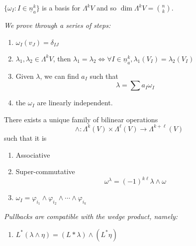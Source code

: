 \documentclass{article}
\numberwithin{equation}{section}
\begin{document}
\begin{definition}
    $\{\omega_I: I \in \underline{n}_a^k\}$ is a basis for $\Lambda^kV$ and so $\dim \Lambda^kV = \binom{n}{k}.$
\end{definition}
\textit{We prove through a series of steps:}
\begin{enumerate}
    \item $\omega_I(v_J) = \delta_{IJ}$
    \item $\lambda_1,\lambda_2\in \Lambda^kV$, then $\lambda_1=\lambda_2 \iff \forall I \in \underline{n}_a^k, \lambda_1(V_I) = \lambda_2(V_I)$
    \item Given $\lambda$, we can find $a_I$ such that
    \begin{equation}
        \lambda = \sum a_I \omega_I
    \end{equation}
    \item the $\omega_I$ are linearly independent.
\end{enumerate}
\begin{theorem}
    There exists a unique family of bilinear operations 
    \begin{equation}
        \wedge: \Lambda^k(V) \times \Lambda^\ell(V) \rightarrow \Lambda^{k+\ell}(V)
    \end{equation}
    such that it is
    \begin{enumerate}
        \item Associative
        \item Super-commutative
        \begin{equation}
            \omega^\lambda = (-1)^{k\ell} \lambda \wedge \omega
        \end{equation}
        \item $\omega_I = \varphi_{i_1} \wedge \varphi_{i_2} \wedge \cdots \wedge \varphi_{i_k}$
    \end{enumerate}
\end{theorem}
\textit{Pullbacks are compatible with the wedge product, namely:}
\begin{enumerate}
    \item $L^*(\lambda \wedge \eta) = (L*\lambda) \wedge (L^*\eta)$
\end{enumerate}
\end{document}
